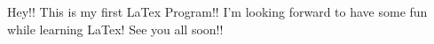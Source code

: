 \documentclass[11pt]{article}
\begin{document}
Hey!! This is my first LaTex Program!! I'm looking forward to have some fun while learning LaTex! See you all soon!!
\end{document}

